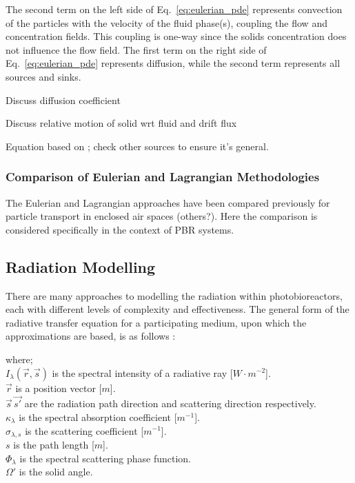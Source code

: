 


The second term on the left side of Eq.\ \ref{eq:eulerian_pde} represents convection of the particles with the velocity of the fluid phase(s), coupling the flow and concentration fields.  This coupling is one-way since the solids concentration does not influence the flow field.  The first term on the right side of Eq.\ \ref{eq:eulerian_pde} represents diffusion, while the second term represents all sources and sinks.

Discuss diffusion coefficient

Discuss relative motion of solid wrt fluid and drift flux

Equation based on \cite{Zhang2007}; check other sources to ensure it's general.
%


\subsubsection{Comparison of Eulerian and Lagrangian Methodologies}

The Eulerian and Lagrangian approaches have been compared previously for particle transport in enclosed air spaces \cite{Zhang2007} (others?). Here the comparison is considered specifically in the context of PBR systems.


\subsection{Radiation Modelling}
\label{S:radiation}
There are many approaches to modelling the radiation within photobioreactors, each with different levels of complexity and effectiveness. The general form of the radiative transfer equation for a participating medium, upon which the approximations are based, is as follows \cite{Modest2003}:



where;\\
$I_\lambda (\vec{r}, \vec{s})$ is the spectral intensity of a radiative ray [$W \cdot m^{-2}$]. \\
$\vec{r}$ is a position vector [$m$]. \\
$\vec{s} \, \vec{s'}$ are the radiation path direction and scattering direction respectively.\\
$\kappa_\lambda$ is the spectral absorption coefficient [$m^{-1}$]. \\
$\sigma_{\lambda, s}$ is the scattering coefficient [$m^{-1}$].  \\
$s$ is the path length [$m$]. \\
$\Phi_\lambda$ is the spectral scattering phase function. \\
$\Omega'$ is the solid angle. \\

